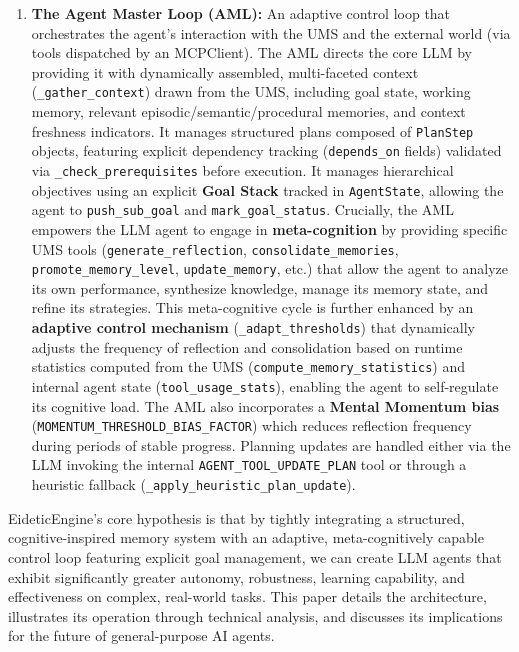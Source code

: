 \documentclass[12pt,a4paper]{article}
\newcommand{\code}[1]{\nolinkurl{#1}}
\begin{document}
\begin{enumerate}
    \item \textbf{The Agent Master Loop (AML):} An adaptive control loop that orchestrates the agent's interaction with the UMS and the external world (via tools dispatched by an MCPClient). The AML directs the core LLM by providing it with dynamically assembled, multi-faceted context (\code{\_gather\_context}) drawn from the UMS, including goal state, working memory, relevant episodic/semantic/procedural memories, and context freshness indicators. It manages structured plans composed of \code{PlanStep} objects, featuring explicit dependency tracking (\code{depends\_on} fields) validated via \code{\_check\_prerequisites} before execution. It manages hierarchical objectives using an explicit \textbf{Goal Stack} tracked in \code{AgentState}, allowing the agent to \code{push\_sub\_goal} and \code{mark\_goal\_status}. Crucially, the AML empowers the LLM agent to engage in \textbf{meta-cognition} by providing specific UMS tools (\code{generate\_reflection}, \code{consolidate\_memories}, \code{promote\_memory\_level}, \code{update\_memory}, etc.) that allow the agent to analyze its own performance, synthesize knowledge, manage its memory state, and refine its strategies. This meta-cognitive cycle is further enhanced by an \textbf{adaptive control mechanism} (\code{\_adapt\_thresholds}) that dynamically adjusts the frequency of reflection and consolidation based on runtime statistics computed from the UMS (\code{compute\_memory\_statistics}) and internal agent state (\code{tool\_usage\_stats}), enabling the agent to self-regulate its cognitive load. The AML also incorporates a \textbf{Mental Momentum bias} (\code{MOMENTUM\_THRESHOLD\_BIAS\_FACTOR}) which reduces reflection frequency during periods of stable progress. Planning updates are handled either via the LLM invoking the internal \code{AGENT\_TOOL\_UPDATE\_PLAN} tool or through a heuristic fallback (\code{\_apply\_heuristic\_plan\_update}).
\end{enumerate}

EideticEngine's core hypothesis is that by tightly integrating a structured, cognitive-inspired memory system with an adaptive, meta-cognitively capable control loop featuring explicit goal management, we can create LLM agents that exhibit significantly greater autonomy, robustness, learning capability, and effectiveness on complex, real-world tasks. This paper details the architecture, illustrates its operation through technical analysis, and discusses its implications for the future of general-purpose AI agents.
\end{document}
